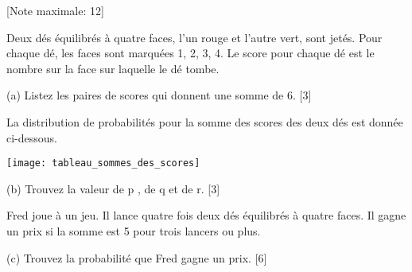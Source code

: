 \begin{question}
  \hspace*{\fill} [Note maximale: 12]\par
  \medskip
  \noindent Deux dés équilibrés à quatre faces, l’un rouge et l’autre vert, sont jetés. Pour chaque dé, les faces sont marquées 1, 2, 3, 4. Le score pour chaque dé est le nombre sur la face sur laquelle le dé tombe.\par
  \medskip
  (a) Listez les paires de scores qui donnent une somme de 6.\hspace*{\fill} [3]\par
  \medskip
  \noindent La distribution de probabilités pour la somme des scores des deux dés est donnée ci-dessous.\par
  \medskip
  \texttt{[image: tableau\_sommes\_des\_scores]}\par
  \medskip
  (b) Trouvez la valeur de p , de q et de r.\hspace*{\fill} [3]\par
  \medskip
  \noindent Fred joue à un jeu. Il lance quatre fois deux dés équilibrés à quatre faces. Il gagne un prix si la somme est 5 pour trois lancers ou plus.\par
  \medskip
  (c) Trouvez la probabilité que Fred gagne un prix.\hspace*{\fill} [6]\par
\end{question}

